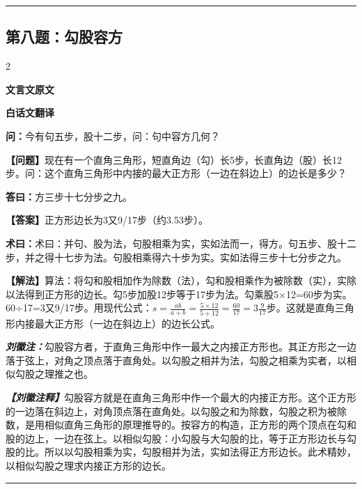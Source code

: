 \documentclass[10pt,a4paper]{article}
\newcommand{\wen}[1]{\textbf{\color{problemcolor}问：}#1\par}
\newcommand{\da}[1]{\textbf{答曰：}#1\par}
\newcommand{\shu}[1]{\textbf{术曰：}#1\par}
\newcommand{\liuhui}[1]{{\color{commentarycolor}\textit{\textbf{刘徽注：}}#1\par}}
\newcommand{\classicalheader}[1]{{\centering\large\bfseries\color{classicalcolor} #1\par\vspace{0.5em}}}
\newcommand{\wenmodern}[1]{\textbf{\color{moderncolor}【问题】}#1\par}
\newcommand{\damodern}[1]{\textbf{【答案】}#1\par}
\newcommand{\shumodern}[1]{\textbf{【解法】}#1\par}
\newcommand{\liuhuimodern}[1]{{\color{commentarycolor}\textit{\textbf{【刘徽注释】}}#1\par}}
\newcommand{\modernheader}[1]{{\centering\large\bfseries\color{moderncolor} #1\par\vspace{0.5em}}}
\newcommand{\problemsec}[1]{\subsection*{#1}}
\begin{document}
\vspace{0.3cm}
\hrule
\vspace{0.3cm}

\problemsec{第八题：勾股容方}
\begin{paracol}{2}
\classicalheader{文言文原文}
\switchcolumn
\modernheader{白话文翻译}
\switchcolumn*

\wen{今有句五步，股十二步，问：句中容方几何？}

\switchcolumn

\wenmodern{现在有一个直角三角形，短直角边（勾）长5步，长直角边（股）长12步。问：这个直角三角形中内接的最大正方形（一边在斜边上）的边长是多少？}

\switchcolumn*

\da{方三步十七分步之九。}

\switchcolumn

\damodern{正方形边长为3又9/17步（约3.53步）。}

\switchcolumn*

\shu{术曰：并句、股为法，句股相乘为实，实如法而一，得方。句五步、股十二步，并之得十七步为法。句股相乘得六十步为实。实如法得三步十七分步之九。}

\switchcolumn

\shumodern{算法：将勾和股相加作为除数（法），勾和股相乘作为被除数（实），实除以法得到正方形的边长。勾5步加股12步等于17步为法。勾乘股5×12=60步为实。60÷17=3又9/17步。用现代公式：$s=\frac{ab}{a+b}=\frac{5\times12}{5+12}=\frac{60}{17}=3\frac{9}{17}$步。这就是直角三角形内接最大正方形（一边在斜边上）的边长公式。}

\switchcolumn*

\liuhui{勾股容方者，于直角三角形中作一最大之内接正方形也。其正方形之一边落于弦上，对角之顶点落于直角处。以勾股之相并为法，勾股之相乘为实者，以相似勾股之理推之也。}

\switchcolumn

\liuhuimodern{勾股容方就是在直角三角形中作一个最大的内接正方形。这个正方形的一边落在斜边上，对角顶点落在直角处。以勾股之和为除数，勾股之积为被除数，是用相似直角三角形的原理推导的。按容方的构造，正方形的两个顶点在勾和股的边上，一边在弦上。以相似勾股：小勾股与大勾股的比，等于正方形边长与勾股的比。所以以勾股相乘为实，勾股相并为法，实如法得正方形边长。此术精妙，以相似勾股之理求内接正方形的边长。}

\end{paracol}

\vspace{0.3cm}
\hrule
\vspace{0.3cm}
\end{document}

